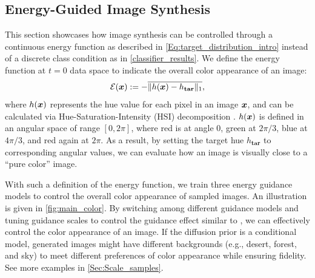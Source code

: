 \subsection{Energy-Guided Image Synthesis}
This section showcases how image synthesis can be controlled through a continuous energy function as described in \eqref{Eq:target_distribution_intro} instead of a discrete class condition as in \cref{classifier_results}. We define the energy function at $t=0$ data space to indicate the overall color appearance of an image:
\begin{equation}
    \label{Eq:color_q0}
    {\mathcal{E}}({\bm{x}}) := - \overline{\| h({\bm{x}}) - h_\textbf{tar} \|_1},
\end{equation}
where $h({\bm{x}})$ represents the hue value for each pixel in an image ${\bm{x}}$, and can be calculated via Hue-Saturation-Intensity (HSI) decomposition \citep{cvbook}.  $h({\bm{x}})$ is defined in an angular space of range $[0, 2\pi]$, where red is at angle $0$, green at $2\pi/3$, blue at $4\pi/3$, and red again at $2\pi$. As a result, by setting the target hue $h_\textbf{tar}$ to corresponding angular values, we can evaluate how an image is visually close to a ``pure color'' image.

With such a definition of the energy function, we train three energy guidance models to control the overall color appearance of sampled images. An illustration is given in \cref{fig:main_color}. By switching among different guidance models and tuning guidance scales to control the guidance effect similar to \citet{diffusion_beat_gan, ho2021classifier}, we can effectively control the color appearance of an image. If the diffusion prior is a conditional model, generated images might have different backgrounds (e.g., desert, forest, and sky) to meet different preferences of color appearance while ensuring fidelity. See more examples in \cref{Sec:Scale_samples}.
